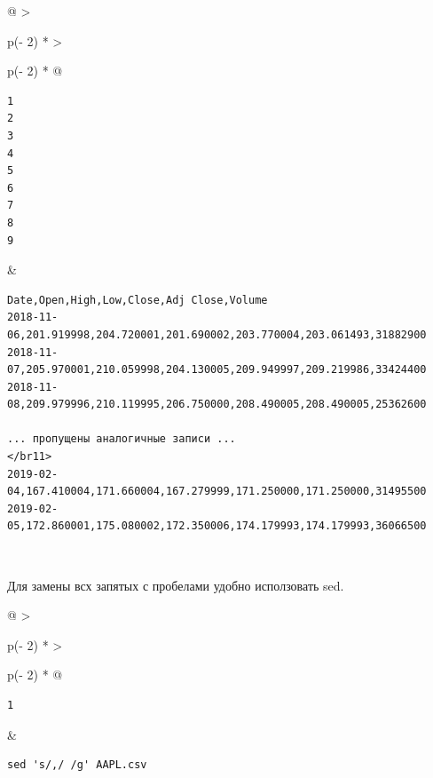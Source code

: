 \documentclass{report}
\begin{document}
\begin{longtable}[]{@{}
  >{\raggedright\arraybackslash}p{(\columnwidth - 2\tabcolsep) * }
  >{\raggedright\arraybackslash}p{(\columnwidth - 2\tabcolsep) * }@{}}
\toprule
\endhead
\begin{minipage}[t]{\linewidth}\raggedright
\begin{verbatim}
1
2
3
4
5
6
7
8
9
\end{verbatim}
\end{minipage} & \begin{minipage}[t]{\linewidth}\raggedright
\begin{verbatim}
Date,Open,High,Low,Close,Adj Close,Volume
2018-11-06,201.919998,204.720001,201.690002,203.770004,203.061493,31882900
2018-11-07,205.970001,210.059998,204.130005,209.949997,209.219986,33424400
2018-11-08,209.979996,210.119995,206.750000,208.490005,208.490005,25362600

... пропущены аналогичные записи ...
</br11>
2019-02-04,167.410004,171.660004,167.279999,171.250000,171.250000,31495500
2019-02-05,172.860001,175.080002,172.350006,174.179993,174.179993,36066500
\end{verbatim}
\end{minipage} \\ \addlinespace
\bottomrule
\end{longtable}

Для замены всх запятых с пробелами удобно исползовать sed.

\begin{longtable}[]{@{}
  >{\raggedright\arraybackslash}p{(\columnwidth - 2\tabcolsep) * }
  >{\raggedright\arraybackslash}p{(\columnwidth - 2\tabcolsep) * }@{}}
\toprule
\endhead
\begin{minipage}[t]{\linewidth}\raggedright
\begin{verbatim}
1
\end{verbatim}
\end{minipage} & \begin{minipage}[t]{\linewidth}\raggedright
\begin{verbatim}
sed 's/,/ /g' AAPL.csv
\end{verbatim}
\end{minipage} \\ \addlinespace
\bottomrule
\end{longtable}
\end{document}
